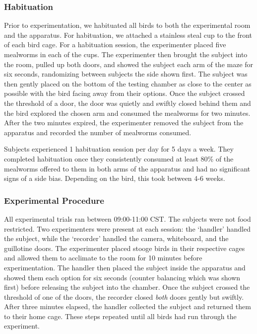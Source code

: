 \documentclass[
  english,
  ,doc,floatsintext]{apa6}
\begin{document}
\hypertarget{habituation}{%
\subsubsection{Habituation}\label{habituation}}

Prior to experimentation, we habituated all birds to both the experimental room and the apparatus. For habituation, we attached a stainless steal cup to the front of each bird cage. For a habituation session, the experimenter placed five mealworms in each of the cups. The experimenter then brought the subject into the room, pulled up both doors, and showed the subject each arm of the maze for six seconds, randomizing between subjects the side shown first. The subject was then gently placed on the bottom of the testing chamber as close to the center as possible with the bird facing away from their options. Once the subject crossed the threshold of a door, the door was quietly and swiftly closed behind them and the bird explored the chosen arm and consumed the mealworms for two minutes. After the two minutes expired, the experimenter removed the subject from the apparatus and recorded the number of mealworms consumed.

Subjects experienced 1 habituation session per day for 5 days a week. They completed habituation once they consistently consumed at least 80\% of the mealworms offered to them in both arms of the apparatus and had no significant signs of a side bias. Depending on the bird, this took between 4-6 weeks.

\hypertarget{experimental-procedure-1}{%
\subsubsection{Experimental Procedure}\label{experimental-procedure-1}}

All experimental trials ran between 09:00-11:00 CST. The subjects were not food restricted. Two experimenters were present at each session: the `handler' handled the subject, while the `recorder' handled the camera, whiteboard, and the guillotine doors. The experimenter placed stooge birds in their respective cages and allowed them to acclimate to the room for 10 minutes before experimentation. The handler then placed the subject inside the apparatus and showed them each option for six seconds (counter balancing which was shown first) before releasing the subject into the chamber. Once the subject crossed the threshold of one of the doors, the recorder closed \emph{both} doors gently but swiftly. After three minutes elapsed, the handler collected the subject and returned them to their home cage. These steps repeated until all birds had run through the experiment.
\end{document}
